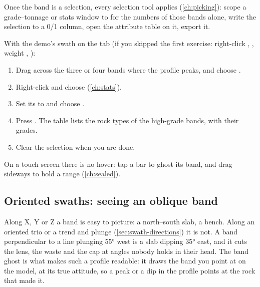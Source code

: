 
Once the band is a selection, every selection tool applies (\cref{ch:picking}): scope a grade–tonnage or stats window to  for the numbers of those bands alone, write the selection to a 0/1 column, open the attribute table on it, export it.

\begin{tryit}
With the demo's swath on the  tab (if you skipped the first exercise: right-click , , weight , ):
\begin{enumerate}
\item Drag across the three or four bands where the profile peaks, and choose .
\item Right-click  and choose  (\cref{ch:stats}).
\item Set its  to  and choose  .
\item Press . The table lists the rock types of the high-grade bands, with their grades.
\item Clear the selection when you are done.
\end{enumerate}
\end{tryit}

On a touch screen there is no hover: tap a bar to ghost its band, and drag sideways to hold a range (\cref{ch:sealed}).

\subsection{Oriented swaths: seeing an oblique band}\label{sec:swath-ghost-oriented}
Along X, Y or Z a band is easy to picture: a north–south slab, a bench. Along an oriented trio or a trend and plunge (\cref{sec:swath-directions}) it is not. A band perpendicular to a line plunging 55° west is a slab dipping 35° east, and it cuts the lens, the waste and the cap at angles nobody holds in their head. The band ghost is what makes such a profile readable: it draws the band you point at on the model, at its true attitude, so a peak or a dip in the profile points at the rock that made it.

